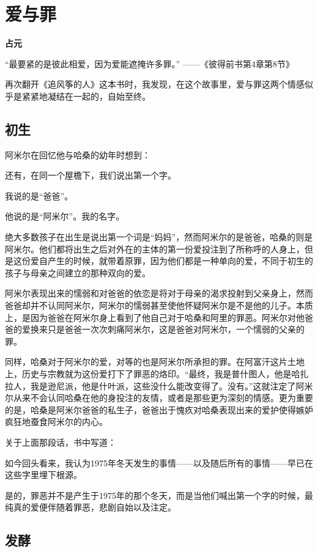 \documentclass[openany,scheme = chinese, linespread = 1.5]{ctexbook}
\newcommand \name[1]{\begin{center} \kaishu \Large \bfseries #1 \end{center}}
\begin{document}
\newpage
\section{爱与罪}
\name{占元}

“最要紧的是彼此相爱，因为爱能遮掩许多罪。”     ——《彼得前书第4章第8节》

再次翻开《追风筝的人》这本书时，我发现，在这个故事里，爱与罪这两个情感似乎是紧紧地凝结在一起的，自始至终。

\subsection*{初生}

阿米尔在回忆他与哈桑的幼年时想到：

还有，在同一个屋檐下，我们说出第一个字。

我说的是“爸爸”。

他说的是“阿米尔”。我的名字。

绝大多数孩子在出生是说出第一个词是“妈妈”，然而阿米尔的是爸爸，哈桑的则是阿米尔。他们都将出生之后对外在的主体的第一份爱投注到了所称呼的人身上，但是这份爱自产生的时候，就带着原罪，因为他们都是一种单向的爱，不同于初生的孩子与母亲之间建立的那种双向的爱。

阿米尔表现出来的懦弱和对爸爸的依恋是将对于母亲的渴求投射到父亲身上，然而爸爸却并不认同阿米尔，阿米尔的懦弱甚至使他怀疑阿米尔是不是他的儿子。本质上，是因为爸爸在阿米尔身上看到了他自己对于哈桑和阿里的罪恶。阿米尔对他爸爸的爱换来只是爸爸一次次刺痛阿米尔，这是爸爸对阿米尔，一个懦弱的父亲的罪。

同样，哈桑对于阿米尔的爱，对等的也是阿米尔所承担的罪。在阿富汗这片土地上，历史与宗教就为这份爱打下了罪恶的烙印。“最终，我是普什图人，他是哈扎拉人，我是逊尼派，他是什叶派，这些没什么能改变得了。没有。”这就注定了阿米尔从来不会认同哈桑在他的身投注的友情，或者是那些更为深刻的情感。更为重要的是，哈桑是阿米尔爸爸的私生子，爸爸出于愧疚对哈桑表现出来的爱护使得嫉妒疯狂地蚕食阿米尔的内心。

关于上面那段话，书中写道：

如今回头看来，我认为1975年冬天发生的事情——以及随后所有的事情——早已在这些字里埋下根源。

是的，罪恶并不是产生于1975年的那个冬天，而是当他们喊出第一个字的时候，最纯真的爱便伴随着罪恶，悲剧自始以及注定。

\subsection*{发酵}
\end{document}
